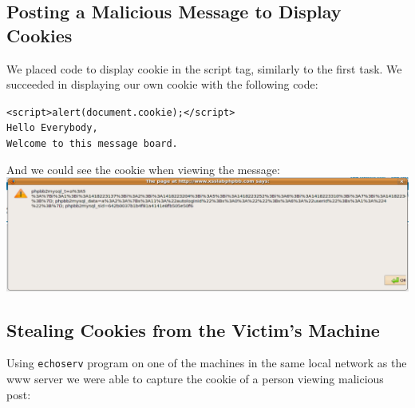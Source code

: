 \documentclass[12pt, a4paper]{article}
\begin{document}
\subsection{Posting a Malicious Message to Display Cookies}
We placed code to display cookie in the script tag, similarly to the first task. We succeeded in displaying our own cookie with the following code:\\
\begin{center}\texttt{<script>alert(document.cookie);</script>\\Hello Everybody,\\Welcome to this message board.}\end{center}

And we could see the cookie when viewing the message:\\
\includegraphics[width=.95\textwidth]{gfx/xss/task2.png}

\subsection{Stealing Cookies from the Victim's Machine}
Using \texttt{echoserv} program on one of the machines in the same local network as the www server we were able to capture the cookie of a person viewing malicious post:\\
\end{document}
